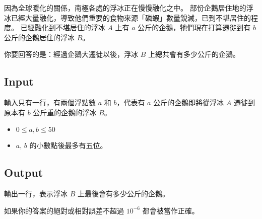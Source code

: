 
因為全球暖化的關係，南極各處的浮冰正在慢慢融化之中。
部份企鵝居住地的浮冰已經大量融化，導致他們重要的食物來源「磷蝦」數量銳減，已到不堪居住的程度。
已經融化到不堪居住的浮冰 $A$ 上有 $a$ 公斤的企鵝，牠們現在打算遷徙到有 $b$ 公斤的企鵝居住的浮冰 $B$。

你要回答的是：經過企鵝大遷徙以後，浮冰 $B$ 上總共會有多少公斤的企鵝。


\subsection*{Input}

輸入只有一行，有兩個浮點數 $a$ 和 $b$，代表有 $a$ 公斤的企鵝即將從浮冰 $A$ 遷徙到原本有 $b$ 公斤重的企鵝的浮冰 $B$。

\begin{itemize}
    \item $0 \leq a, b \leq 50$
    \item $a$, $b$ 的小數點後最多有五位。
\end{itemize}

\subsection*{Output}

輸出一行，表示浮冰 $B$ 上最後會有多少公斤的企鵝。

如果你的答案的絕對或相對誤差不超過 $10^{-6}$ 都會被當作正確。
